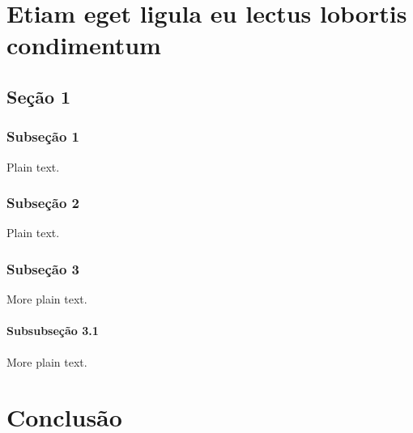 \documentclass[12pt,twoside,openright,a4paper]{abntex2}
\begin{document}
\chapter{Etiam eget ligula eu lectus lobortis condimentum}

\lipsum[1-3]

\section{Seção 1}

\lipsum[4-5]

\subsection{Subseção 1}

Plain text.

\lipsum[6-10]

\subsection{Subseção 2}

Plain text.

\lipsum[11-15]

\subsection{Subseção 3}

More plain text.

\lipsum[16-17]

\subsubsection{Subsubseção 3.1}

More plain text.

\lipsum[18-20]



\chapter*{Conclusão}

\lipsum[21-23]


\end{document}
